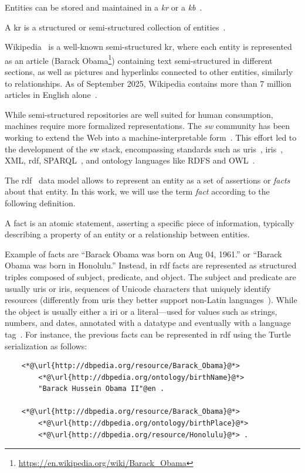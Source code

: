 Entities can be stored and maintained in a \emph{\acl{kr}} or a \emph{\acl{kb}}~\cite{entityorientedsearch2018balog}.
%
\begin{definition}[\Acl{kr}]
A \acf{kr} is a structured or semi-structured collection of entities~\cite{entityorientedsearch2018balog}.
\end{definition}

Wikipedia~\cite{wikipedia:wikipedia} is a well-known semi-structured \acl{kr}, where each entity is represented as an article (\eg Barack Obama\footnote{\url{https://en.wikipedia.org/wiki/Barack\_Obama}}) containing text semi-structured in different sections, as well as pictures and hyperlinks connected to other entities, similarly to relationships. As of September 2025, Wikipedia contains more than 7 million articles in English alone~\cite{Wikipedia:SizeOfWikipedia}.

While semi-structured repositories are well suited for human consumption, machines require more formalized representations. The \emph{\acl{sw}} community has been working to extend the Web into a machine-interpretable form~\cite{entityorientedsearch2018balog,decker_sw_rdf_xml_roles_2000}. This effort led to the development of the \acl{sw} stack, encompassing standards such as \acfp{uri}~\cite{berners-lee2005uri}, \acfp{iri}~\cite{durst2005iri}, XML, \acs{rdf}, SPARQL~\cite{prudhommeaux2008sparql}, and ontology languages like RDFS and OWL~\cite{entityorientedsearch2018balog}.

The \acf{rdf}~\cite{klyne2004rdf} data model allows to represent an entity as a set of assertions or \emph{facts} about that entity. In this work, we will use the term \emph{fact} according to the following definition.
\begin{definition}[Fact]
    A fact is an atomic statement, asserting a specific piece of information, typically describing a property of an entity or a relationship between entities.
\end{definition}
Example of facts are ``Barack Obama was born on Aug 04, 1961.'' or ``Barack Obama was born in Honolulu.''
Instead, in \ac{rdf} facts are represented as structured triples composed of subject, predicate, and object. The subject and predicate are usually \acp{uri} or \acp{iri}, sequences of Unicode characters that uniquely identify resources (differently from \acp{uri} they better support non-Latin languages~\cite{durst2005iri}). While the object is usually either a \ac{iri} or a literal---used for values such as strings, numbers, and dates, annotated with a datatype and eventually with a language tag~\cite{klyne2004rdf}.
%
For instance, the previous facts can be represented in \ac{rdf} using the Turtle~\cite{prudhommeaux2014turtle} serialization as follows:
%
\begin{lstlisting}
    <*@\url{http://dbpedia.org/resource/Barack_Obama}@*>
        <*@\url{http://dbpedia.org/ontology/birthName}@*>
        "Barack Hussein Obama II"@en .

    <*@\url{http://dbpedia.org/resource/Barack_Obama}@*>
        <*@\url{http://dbpedia.org/ontology/birthPlace}@*>
        <*@\url{http://dbpedia.org/resource/Honolulu}@*> .
\end{lstlisting}

